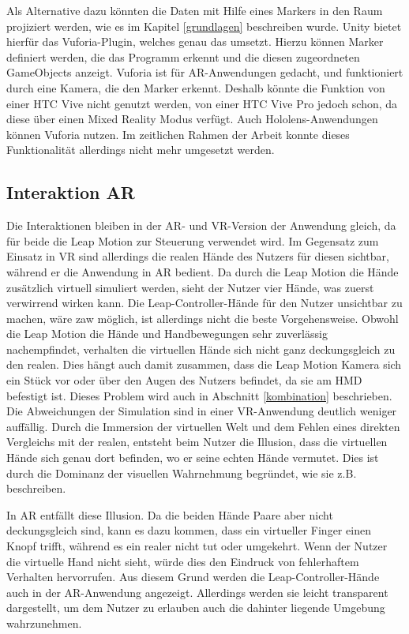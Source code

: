 Als Alternative dazu könnten die Daten mit Hilfe eines Markers in den Raum projiziert werden, wie es im Kapitel \ref{grundlagen} beschreiben wurde. Unity bietet hierfür das Vuforia-Plugin, welches genau das umsetzt. Hierzu können Marker definiert werden, die das Programm erkennt und die diesen zugeordneten GameObjects anzeigt. 
Vuforia ist für AR-Anwendungen gedacht, und funktioniert durch eine Kamera, die den Marker erkennt. Deshalb könnte die Funktion von einer HTC Vive nicht genutzt werden, von einer HTC Vive Pro jedoch schon, da diese über einen Mixed Reality Modus verfügt. Auch Hololens-Anwendungen können Vuforia nutzen. 
Im zeitlichen Rahmen der Arbeit konnte dieses Funktionalität allerdings nicht mehr umgesetzt werden.

\subsection{Interaktion AR}

Die Interaktionen bleiben in der AR- und VR-Version der Anwendung gleich, da für beide die Leap Motion zur Steuerung verwendet wird.
Im Gegensatz zum Einsatz in VR sind allerdings die realen Hände des Nutzers für diesen sichtbar, während er die Anwendung in AR bedient. Da durch die Leap Motion die Hände zusätzlich virtuell simuliert werden, sieht der Nutzer vier Hände, was zuerst verwirrend wirken kann. 
Die Leap-Controller-Hände für den Nutzer unsichtbar zu machen, wäre zaw möglich, ist allerdings nicht die beste Vorgehensweise. Obwohl die Leap Motion die Hände und Handbewegungen sehr zuverlässig nachempfindet, verhalten die virtuellen Hände sich nicht ganz deckungsgleich zu den realen. Dies hängt auch damit zusammen, dass die Leap Motion Kamera sich ein Stück vor oder über den Augen des Nutzers befindet, da sie am HMD befestigt ist. Dieses Problem wird auch in Abschnitt \ref{kombination} beschrieben.
Die Abweichungen der Simulation sind in einer VR-Anwendung deutlich weniger auffällig. Durch die Immersion der virtuellen Welt und dem Fehlen eines direkten Vergleichs mit der realen, entsteht beim Nutzer die Illusion, dass die virtuellen Hände sich genau dort befinden, wo er seine echten Hände vermutet. Dies ist durch die Dominanz der visuellen Wahrnehmung begründet, wie sie z.B. \cite{Azmandian16} beschreiben.

In AR entfällt diese Illusion. Da die beiden Hände Paare aber nicht deckungsgleich sind, kann es dazu kommen, dass ein virtueller Finger einen Knopf trifft, während es ein realer nicht tut oder umgekehrt. Wenn der Nutzer die virtuelle Hand nicht sieht, würde dies den Eindruck von fehlerhaftem Verhalten hervorrufen. 
Aus diesem Grund werden die Leap-Controller-Hände auch in der AR-Anwendung angezeigt. Allerdings werden sie leicht transparent dargestellt, um dem Nutzer zu erlauben auch die dahinter liegende Umgebung wahrzunehmen. 

